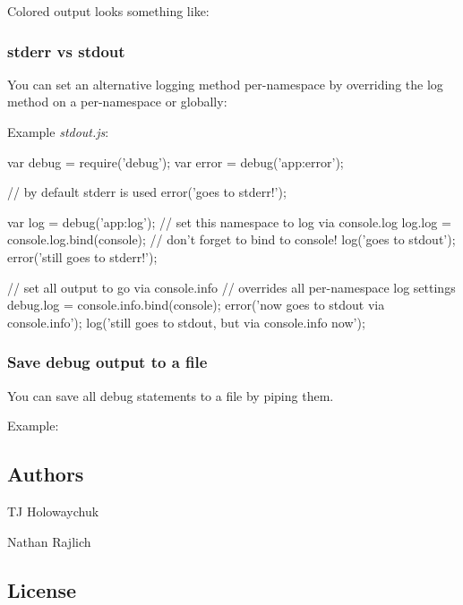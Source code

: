 Colored output looks something like\+:



\subsubsection*{stderr vs stdout}

You can set an alternative logging method per-\/namespace by overriding the {\ttfamily log} method on a per-\/namespace or globally\+:

Example {\itshape stdout.\+js}\+:


\begin{DoxyCode}
var debug = require('debug');
var error = debug('app:error');

// by default stderr is used
error('goes to stderr!');

var log = debug('app:log');
// set this namespace to log via console.log
log.log = console.log.bind(console); // don't forget to bind to console!
log('goes to stdout');
error('still goes to stderr!');

// set all output to go via console.info
// overrides all per-namespace log settings
debug.log = console.info.bind(console);
error('now goes to stdout via console.info');
log('still goes to stdout, but via console.info now');
\end{DoxyCode}


\subsubsection*{Save debug output to a file}

You can save all debug statements to a file by piping them.

Example\+:




\subsection*{Authors}


\begin{DoxyItemize}
\item TJ Holowaychuk
\item Nathan Rajlich
\end{DoxyItemize}

\subsection*{License}

